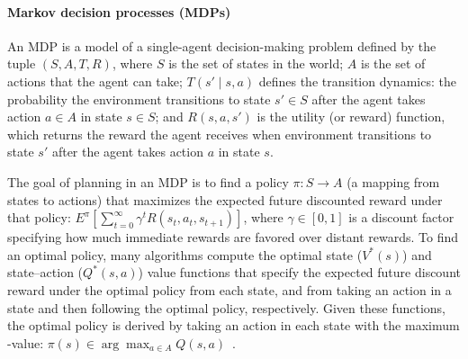 
\vspace{\up}
\paragraph{Markov decision processes (MDPs)}

An MDP is a model of a single-agent
decision-making problem defined by the tuple $(S, A, T, R)$, where
$S$ is the set of states in the world; $A$ is the set of actions that
the agent can take; $T(s' \mid s, a)$ defines the transition dynamics:
the probability the environment transitions to state $s' \in S$
after the agent takes action $a \in A$ in state $s \in S$; and 
$R(s, a, s')$ is the utility (or reward) function, which returns the reward the
agent receives when environment transitions to state $s'$ after the
agent takes action $a$ in state $s$.

The goal of planning in an MDP is to find a policy $\pi :
S \rightarrow A$ (a mapping from states to actions) that maximizes the
expected future discounted reward under that policy:
$E^{\pi} \left[ \sum_{t=0}^\infty \gamma^t R(s_t, a_t,
s_{t+1}) \right]$, where $\gamma \in [0, 1]$ is a discount factor
specifying how much immediate rewards are favored over distant
rewards.
%
To find an optimal policy, many algorithms compute the optimal state
($V^*(s)$) and state--action ($Q^*(s,a)$) value functions that specify
the expected future discount reward under the optimal policy from each
state, and from taking an action in a state and then following the
optimal policy, respectively. 
Given these functions, the optimal policy is derived by taking an
action in each state with the maximum \Q-value: 
$\pi(s) \in \arg\max_{a \in A} Q(s, a)$~\cite{bertsekas87}.

